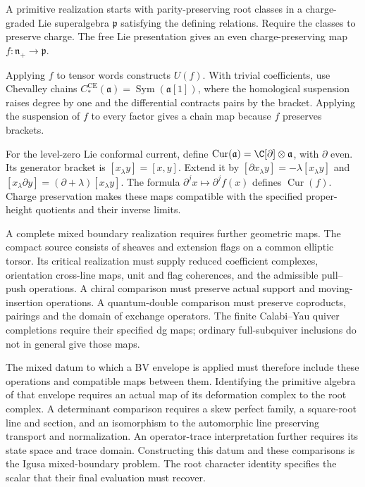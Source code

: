 A primitive realization starts with parity-preserving root classes in a charge-graded Lie superalgebra $\mathfrak p$ satisfying the defining relations. Require the classes to preserve charge. The free Lie presentation gives an even charge-preserving map $f:\mathfrak n_+\to\mathfrak p$.

Applying $f$ to tensor words constructs $U(f)$. With trivial coefficients, use Chevalley chains $C_*^{\mathrm{CE}}(\mathfrak a)=\operatorname{Sym}(\mathfrak a[1])$, where the homological suspension raises degree by one and the differential contracts pairs by the bracket. Applying the suspension of $f$ to every factor gives a chain map because $f$ preserves brackets.

For the level-zero Lie conformal current, define $\operatorname{Cur}(\mathfrak a)=\C[\partial]\otimes\mathfrak a$, with $\partial$ even. Its generator bracket is $[x_\lambda y]=[x,y]$. Extend it by $[\partial x_\lambda y]=-\lambda[x_\lambda y]$ and $[x_\lambda\partial y]=(\partial+\lambda)[x_\lambda y]$. The formula $\partial^j x\mapsto\partial^j f(x)$ defines $\operatorname{Cur}(f)$. Charge preservation makes these maps compatible with the specified proper-height quotients and their inverse limits.

A complete mixed boundary realization requires further geometric maps.
The compact source consists of sheaves and extension flags on a common
elliptic torsor. Its critical realization must supply reduced coefficient
complexes, orientation cross-line maps, unit and flag coherences, and the
admissible pull--push operations. A chiral comparison must preserve actual
support and moving-insertion operations. A quantum-double comparison must
preserve coproducts, pairings and the domain of exchange operators.
The finite Calabi--Yau quiver completions require their specified dg maps;
ordinary full-subquiver inclusions do not in general give those maps.

The mixed datum to which a BV envelope is applied must therefore include
these operations and compatible maps between them. Identifying the
primitive algebra of that envelope requires an actual map of its
deformation complex to the root complex. A determinant comparison requires
a skew perfect family, a square-root line and section, and an isomorphism
to the automorphic line preserving transport and normalization.
An operator-trace interpretation further requires its state space and
trace domain. Constructing this datum and these comparisons is the Igusa
mixed-boundary problem. The root character identity specifies the scalar
that their final evaluation must recover.

